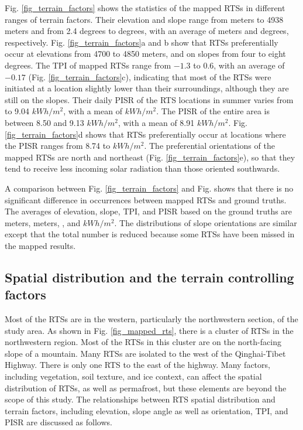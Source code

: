 \documentclass[authoryear,preprint,review,12pt]{elsarticle}
\begin{document}
Fig. \ref{fig_terrain_factors} shows the statistics of the mapped RTSs in different ranges of terrain factors. Their elevation and slope range from  meters to 4938 meters and from 2.4 degrees to  degrees, with an average of  meters and  degrees, respectively. Fig. \ref{fig_terrain_factors}a and b show that RTSs preferentially occur at elevations from 4700 to 4850 meters, and on slopes from four to eight degrees. The TPI of mapped RTSs range from $-1.3$ to 0.6, with an average of $-0.17$ (Fig. \ref{fig_terrain_factors}c), indicating that most of the RTSs were initiated at a location slightly lower than their surroundings, although they are still on the slopes.  Their daily PISR of the RTS locations in summer varies from  to 9.04 $kWh/m^2$, with a mean of  $kWh/m^2$. The PISR of the entire area is between 8.50 and 9.13 $kWh/m^2$, with a mean of 8.91 $kWh/m^2$. Fig. \ref{fig_terrain_factors}d shows that RTSs preferentially occur at locations where the PISR ranges from 8.74 to  $kWh/m^2$.
The preferential orientations of the mapped RTSs are north and northeast (Fig. \ref{fig_terrain_factors}e), so that they tend to receive less incoming solar radiation than those oriented southwards. 

A comparison between Fig. \ref{fig_terrain_factors} and Fig.  shows that there is no significant difference in occurrences between mapped RTSs and ground truths. The averages of elevation, slope, TPI, and PISR based on the ground truths are  meters,  meters, , and  $kWh/m^2$. The distributions of slope orientations are similar except that the total number is reduced because some RTSs have been missed in the mapped results. 

\subsection{Spatial distribution and the terrain controlling factors}
\label{subsec_rts_spatial}

Most of the RTSs are in the western, particularly the northwestern section, of the study area. As shown in Fig. \ref{fig_mapped_rts}, there is a cluster of RTSs in the northwestern region. Most of the RTSs in this cluster are on the north-facing slope of a mountain.  Many RTSs are isolated to the west of the Qinghai-Tibet Highway. There is only one RTS to the east of the highway. Many factors, including vegetation, soil texture, and ice context, can affect the spatial distribution of RTSs, as well as permafrost, but these elements are beyond the scope of this study. The relationships between RTS spatial distribution and terrain factors, including elevation, slope angle as well as orientation, TPI, and PISR are discussed as follows.
\end{document}

